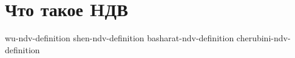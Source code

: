 \section{Что такое HДВ}

    {wu-ndv-definition}
    {shen-ndv-definition}
    {basharat-ndv-definition}
    {cherubini-ndv-definition}

